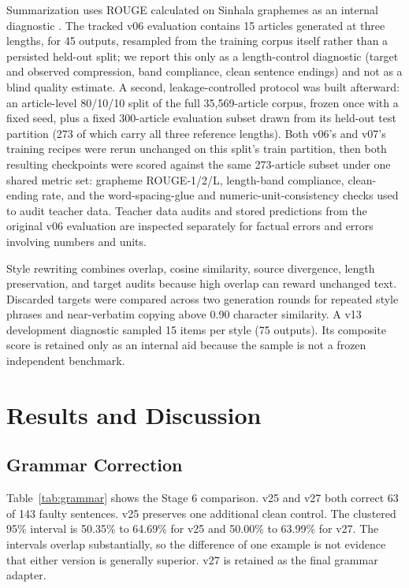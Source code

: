 \documentclass[a4paper,conference]{IEEEtran}
\begin{document}
Summarization uses ROUGE calculated on Sinhala graphemes as an internal
diagnostic \cite{lin2004rouge}. The tracked v06 evaluation contains 15 articles
generated at three lengths, for 45 outputs, resampled from the training corpus
itself rather than a persisted held-out split; we report this only as a
length-control diagnostic (target and observed compression, band compliance,
clean sentence endings) and not as a blind quality estimate. A second,
leakage-controlled protocol was built afterward: an article-level 80/10/10
split of the full 35,569-article corpus, frozen once with a fixed seed, plus
a fixed 300-article evaluation subset drawn from its held-out test partition
(273 of which carry all three reference lengths). Both v06's and v07's
training recipes were rerun unchanged on this split's train partition, then
both resulting checkpoints were scored against the same 273-article subset
under one shared metric set: grapheme ROUGE-1/2/L, length-band compliance,
clean-ending rate, and the word-spacing-glue and numeric-unit-consistency
checks used to audit teacher data. Teacher data audits and stored predictions
from the original v06 evaluation are inspected separately for factual errors
and errors involving numbers and units.

Style rewriting combines overlap, cosine similarity, source divergence, length
preservation, and target audits because high overlap can reward unchanged text.
Discarded targets were compared across two generation rounds for repeated style
phrases and near-verbatim copying above 0.90 character similarity. A v13
development diagnostic sampled 15 items per style (75 outputs). Its composite
score is retained only as an internal aid because the sample is not a frozen
independent benchmark.

\section{Results and Discussion}
\label{sec:results}
\subsection{Grammar Correction}
Table~\ref{tab:grammar} shows the Stage 6 comparison. v25 and v27 both correct
63 of 143 faulty sentences. v25 preserves one additional clean control. The clustered 95\% interval is 50.35\% to 64.69\% for v25 and 50.00\%
to 63.99\% for v27. The intervals overlap substantially, so the difference of
one example is not evidence that either version is generally superior. v27 is
retained as the final grammar adapter.
\end{document}
